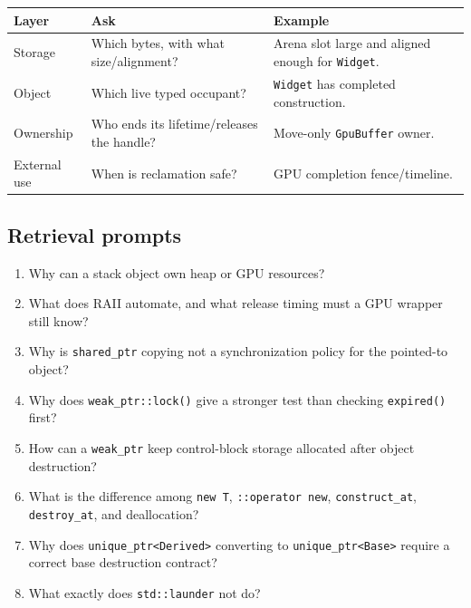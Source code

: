 {\def\LTcaptype{none} %
\begin{longtable}[]{@{}
  >{\raggedright\arraybackslash}p{}
  >{\raggedright\arraybackslash}p{}
  >{\raggedright\arraybackslash}p{}@{}}
\toprule\noalign{}
\begin{minipage}[b]{\linewidth}\raggedright
Layer
\end{minipage} & \begin{minipage}[b]{\linewidth}\raggedright
Ask
\end{minipage} & \begin{minipage}[b]{\linewidth}\raggedright
Example
\end{minipage} \\
\midrule\noalign{}
\endhead
\bottomrule\noalign{}
\endlastfoot
Storage & Which bytes, with what size/alignment? & Arena slot large and aligned enough for \texttt{Widget}. \\
Object & Which live typed occupant? & \texttt{Widget} has completed construction. \\
Ownership & Who ends its lifetime/releases the handle? & Move-only \texttt{GpuBuffer} owner. \\
External use & When is reclamation safe? & GPU completion fence/timeline. \\
\end{longtable}
}

\subsection{Retrieval prompts}\label{appendix-960160274237-retrieval-prompts}

\begin{enumerate}
\def\labelenumi{\arabic{enumi}.}
\tightlist
\item
  Why can a stack object own heap or GPU resources?
\item
  What does RAII automate, and what release timing must a GPU wrapper still know?
\item
  Why is \texttt{shared\_ptr} copying not a synchronization policy for the pointed-to object?
\item
  Why does \texttt{weak\_ptr::lock()} give a stronger test than checking \texttt{expired()} first?
\item
  How can a \texttt{weak\_ptr} keep control-block storage allocated after object destruction?
\item
  What is the difference among \texttt{new\ T}, \texttt{::operator\ new}, \texttt{construct\_at}, \texttt{destroy\_at}, and deallocation?
\item
  Why does \texttt{unique\_ptr\textless{}Derived\textgreater{}} converting to \texttt{unique\_ptr\textless{}Base\textgreater{}} require a correct base destruction contract?
\item
  What exactly does \texttt{std::launder} not do?
\end{enumerate}

